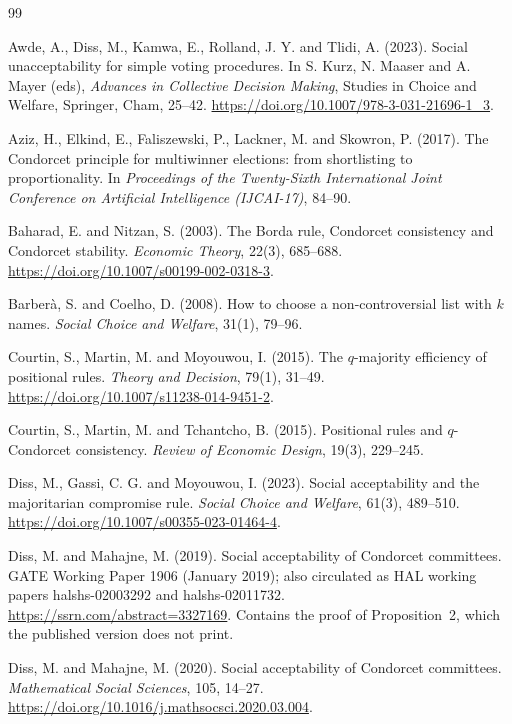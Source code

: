 \documentclass[11pt]{article}
\theoremstyle{plain}
\theoremstyle{definition}
\begin{document}
\begin{thebibliography}{99}

 Awde, A., Diss, M., Kamwa, E., Rolland, J. Y. and Tlidi, A. (2023). Social unacceptability for simple voting procedures. In S. Kurz, N. Maaser and A. Mayer (eds), \emph{Advances in Collective Decision Making}, Studies in Choice and Welfare, Springer, Cham, 25--42. \url{https://doi.org/10.1007/978-3-031-21696-1_3}.

 Aziz, H., Elkind, E., Faliszewski, P., Lackner, M. and Skowron, P. (2017). The Condorcet principle for multiwinner elections: from shortlisting to proportionality. In \emph{Proceedings of the Twenty-Sixth International Joint Conference on Artificial Intelligence (IJCAI-17)}, 84--90.

 Baharad, E. and Nitzan, S. (2003). The Borda rule, Condorcet consistency and Condorcet stability. \emph{Economic Theory}, 22(3), 685--688. \url{https://doi.org/10.1007/s00199-002-0318-3}.

 Barberà, S. and Coelho, D. (2008). How to choose a non-controversial list with $k$ names. \emph{Social Choice and Welfare}, 31(1), 79--96.

 Courtin, S., Martin, M. and Moyouwou, I. (2015). The $q$-majority efficiency of positional rules. \emph{Theory and Decision}, 79(1), 31--49. \url{https://doi.org/10.1007/s11238-014-9451-2}.

 Courtin, S., Martin, M. and Tchantcho, B. (2015). Positional rules and $q$-Condorcet consistency. \emph{Review of Economic Design}, 19(3), 229--245.

 Diss, M., Gassi, C. G. and Moyouwou, I. (2023). Social acceptability and the majoritarian compromise rule. \emph{Social Choice and Welfare}, 61(3), 489--510. \url{https://doi.org/10.1007/s00355-023-01464-4}.

 Diss, M. and Mahajne, M. (2019). Social acceptability of Condorcet committees. GATE Working Paper 1906 (January 2019); also circulated as HAL working papers halshs-02003292 and halshs-02011732. \url{https://ssrn.com/abstract=3327169}. Contains the proof of Proposition~2, which the published version does not print.

 Diss, M. and Mahajne, M. (2020). Social acceptability of Condorcet committees. \emph{Mathematical Social Sciences}, 105, 14--27. \url{https://doi.org/10.1016/j.mathsocsci.2020.03.004}.


\end{thebibliography}
\end{document}
